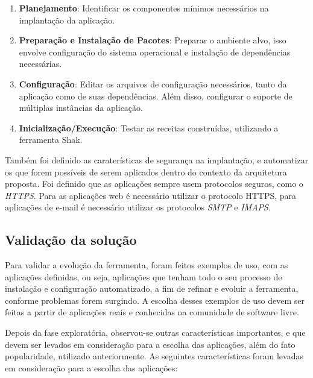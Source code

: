 \begin{enumerate}
  \item  \textbf{Planejamento}: Identificar os componentes mínimos necessários na implantação
 da aplicação.  
  \item  \textbf{Preparação e Instalação de Pacotes}: Preparar o ambiente alvo, 
isso envolve configuração do sistema operacional e instalação de dependências necessárias.
  \item  \textbf{Configuração}: Editar os arquivos de configuração necessários, tanto 
da aplicação como de suas dependências. Além disso, configurar o suporte de múltiplas instâncias
da aplicação.   
  \item  \textbf{Inicialização/Execução}: Testar as receitas construídas, utilizando
a ferramenta Shak. 
\end{enumerate}

Também foi definido as caraterísticas de segurança na implantação, e
automatizar os que forem possíveis de serem aplicados dentro do contexto da
arquitetura proposta. Foi definido que as aplicações sempre usem protocolos 
seguros, como o \textit{HTTPS}. 
Para as aplicações web é necessário utilizar o protocolo HTTPS, para aplicações
de e-mail é necessário utilizar os protocolos \textit{SMTP} e \textit{IMAPS}.

\subsection{Validação da solução}
\label{subsection:validacao}

Para validar a evolução da ferramenta, foram feitos exemplos de uso,
com as aplicações definidas, ou seja, aplicações que tenham todo o seu 
processo de instalação e configuração automatizado, a
fim de refinar e evoluir a ferramenta, conforme problemas forem surgindo. A escolha
desses exemplos de uso devem ser feitas a partir de aplicações reais e
conhecidas na comunidade de software livre. 

Depois da fase exploratória, observou-se outras características importantes, e que 
devem ser levados em consideração para a escolha das aplicações, além do fato 
popularidade, utilizado anteriormente. As seguintes 
características foram levadas em consideração para a escolha das aplicações:

